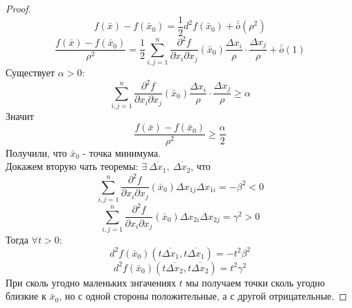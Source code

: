 \begin{proof}
    \[f(\bar{x})-f(\bar{x}_0)=\frac{1}{2}d^2f(\bar{x}_0)+\bar{\bar{o}}{(\rho^2)}\]
    \[\frac{f(\bar{x})-f(\bar{x}_0)}{\rho^2}=\frac{1}{2}\sum\limits_{i,j=1}^{n}\frac{\partial^2 {f}}{\partial {x_i} \partial x_j}(\bar{x}_0)\frac{\Delta x_i}{\rho}\cdot \frac{\Delta x_j}{\rho}+\bar{\bar{o}}{(1)}\]
    Существует $\alpha>0$: 
    \[\sum\limits_{i,j=1}^{n}\frac{\partial^2 {f}}{\partial {x_i}\partial x_j}(\bar{x}_0) \frac{\Delta x_i}{\rho}\cdot \frac{\Delta x_j}{\rho}\geq \alpha\]
    Значит
    \[\frac{f(\bar{x})-f(\bar{x}_0)}{\rho^2}\geq \frac{\alpha}{2}\]
    Получили, что $\bar{x}_0$ - точка минимума.\\
    Докажем вторую чать теоремы: $\exists\ \overline{\Delta x_1},\ \overline{\Delta x_2}$, что
    \[\sum\limits_{i,j=1}^{n}\frac{\partial^2 {f}}{\partial {x_i} \partial x_j}(\bar{x}_0)\Delta x_{1j}\Delta x_{1i}=-\beta^2<0\]
    \[\sum\limits_{i,j=1}^{n}\frac{\partial^2 {f}}{\partial {x_i} \partial x_j}(\bar{x}_0)\Delta x_{2i}\Delta x_{2j}=\gamma^2>0\]
    Тогда $\forall t>0$:
    \[d^2f(\bar{x}_0)(t \overline{\Delta x_1}, t\overline{\Delta x_1})=-t^2\beta^2\]
    \[d^2f(\bar{x}_0)(t \overline{\Delta x_2}, t\overline{\Delta x_2})=t^2\gamma^2\]
    При сколь угодно маленьких знгачениях $t$ мы получаем точки сколь угодно близкие к $\bar{x}_0$, но с одной стороны положительные, а с другой отрицательные.
\end{proof} 
